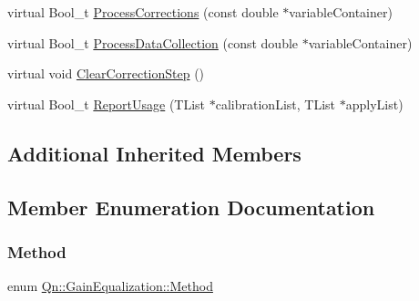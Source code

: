 \begin{DoxyCompactItemize}
\item 
virtual Bool\+\_\+t \mbox{\hyperlink{classQn_1_1GainEqualization_ade22bc9b3aee596b6594d8a8d6fdc1f1}{Process\+Corrections}} (const double $\ast$variable\+Container)
\item 
virtual Bool\+\_\+t \mbox{\hyperlink{classQn_1_1GainEqualization_a9984ec9a1056bc3e336ff9ac50888641}{Process\+Data\+Collection}} (const double $\ast$variable\+Container)
\item 
virtual void \mbox{\hyperlink{classQn_1_1GainEqualization_a8ee1f2ecf6929de35d455515a067ac9c}{Clear\+Correction\+Step}} ()
\item 
virtual Bool\+\_\+t \mbox{\hyperlink{classQn_1_1GainEqualization_af444038af10eb53d8bd6c8703d4e5629}{Report\+Usage}} (T\+List $\ast$calibration\+List, T\+List $\ast$apply\+List)
\end{DoxyCompactItemize}
\subsection*{Additional Inherited Members}


\subsection{Member Enumeration Documentation}
\mbox{\label{classQn_1_1GainEqualization_ab49157ee7419c78638467d5a070c2c23}} 
\subsubsection{\texorpdfstring{Method}{Method}}
{\footnotesize\ttfamily enum \mbox{\hyperlink{classQn_1_1GainEqualization_ab49157ee7419c78638467d5a070c2c23}{Qn\+::\+Gain\+Equalization\+::\+Method}}\hspace{0.3cm}{\ttfamily [strong]}}

